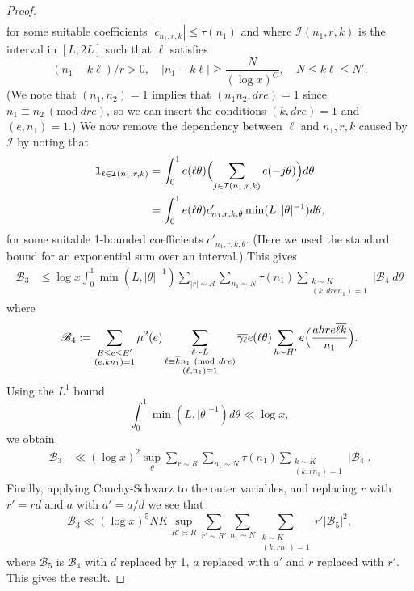 \documentclass[10pt]{amsart}
\theoremstyle{plain}
\numberwithin{equation}{section}
\newcommand{\Mod}[1]{\ (\mathrm{mod}\ #1)}
\begin{document}
\begin{proof}
\begin{align*}
\end{align*}
for some suitable coefficients $|c_{n_1,r,k}|\le \tau(n_1)$ and where $\mathcal{I}(n_1,r,k)$ is the interval in $[L,2L]$ such that $\ell$ satisfies
\[
(n_1-k\ell)/r>0,\quad |n_1-k\ell|\ge\frac{N}{(\log{x})^C},\quad N\le k\ell\le N'.
\]
(We note that $(n_1,n_2)=1$ implies that $(n_1n_2,dre)=1$ since $n_1\equiv n_2\Mod{dre}$, so we can insert the conditions $(k,dre)=1$ and $(e,n_1)=1$.) 
We now remove the dependency between $\ell$ and $n_1,r,k$ caused by $\mathcal{I}$ by noting that
\begin{align*}
\mathbf{1}_{\ell\in\mathcal{I}(n_1,r,k)}&=\int_0^1 e(\ell\theta)\Bigl(\sum_{j\in\mathcal{I}(n_1,r,k)}e(-j\theta)\Bigr)d\theta\\
&=\int_0^1e(\ell\theta) c'_{n_1,r,k,\theta}\min(L,|\theta|^{-1})d\theta,
\end{align*}
for some suitable 1-bounded coefficients $c'_{n_1,r,k,\theta}$. (Here we used the standard bound for an exponential sum over an interval.)  This gives
\begin{align*}
\mathscr{B}_3&\le \log{x}\int_0^1\min(L,|\theta|^{-1})\sum_{|r| \sim R}\sum_{n_1\sim N}\tau(n_1)\sum_{\substack{k\sim K\\ (k,d r e n_1)=1}}|\mathscr{B}_4|d\theta
\end{align*}
where
\begin{align*}
\mathscr{B}_4:=\sum_{\substack{E\le e\le E'\\ (e,k n_1)=1}}\mu^2(e)\sum_{\substack{\ell\sim L\\ \ell \equiv \overline{k}n_1\Mod{d r e} \\ (\ell,n_1)=1}}\overline{\gamma_\ell}e(\ell\theta)\sum_{h\sim H'} e\Bigl(\frac{ah r e\overline{\ell k}}{n_1}\Bigr).
\end{align*}
Using the $L^1$ bound
\[
\int_0^1 \min(L,|\theta|^{-1})d\theta\ll \log{x},
\]
we obtain
\begin{align*}
\mathscr{B}_3&\ll (\log{x})^2\sup_{\theta}\sum_{r \sim R}\sum_{n_1\sim N}\tau(n_1)\sum_{\substack{k\sim K\\ (k,r n_1)=1}}|\mathscr{B}_4|.
\end{align*}
Finally, applying Cauchy-Schwarz to the outer variables, and replacing $r$ with $r'=r d$ and $a$ with $a'=a/d$ we see that
\[
\mathscr{B}_3\ll (\log{x})^5 N K \sup_{R'\asymp R}\sum_{r'\sim R'}\sum_{n_1\sim N}\sum_{\substack{k\sim K\\ (k,r n_1)=1}}r' |\mathscr{B}_5|^2,
\]
where $\mathscr{B}_5$ is $\mathscr{B}_4$ with $d$ replaced by 1, $a$ replaced with $a'$ and $r$ replaced with $r'$. This gives the result.
\end{proof}
\end{document}
